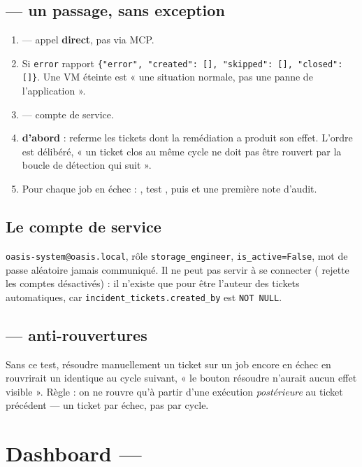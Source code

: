 \subsection*{ --- un passage, sans exception}

\begin{enumerate}
  \item {} --- appel \textbf{direct}, pas via MCP.
  \item Si \texttt{error} \arrowto{} rapport
  \texttt{\{"error", "created": [], "skipped": [], "closed": []\}}. Une VM
  éteinte est « une situation normale, pas une panne de l'application ».
  \item {} --- compte de service.
  \item {} \textbf{d'abord} : referme les tickets dont la
  remédiation a produit son effet. L'ordre est délibéré, « un ticket clos au
  même cycle ne doit pas être rouvert par la boucle de détection qui suit ».
  \item Pour chaque job en échec : , test
  , puis  et une
  première note d'audit.
\end{enumerate}

\subsection*{Le compte de service}
\texttt{oasis-system@oasis.local}, rôle \texttt{storage\_engineer},
\texttt{is\_active=False}, mot de passe aléatoire jamais communiqué. Il ne peut
pas servir à se connecter ( rejette les comptes
désactivés) : il n'existe que pour être l'auteur des tickets automatiques, car
\texttt{incident\_tickets.created\_by} est \texttt{NOT NULL}.

\subsection*{ --- anti-rouvertures}
Sans ce test, résoudre manuellement un ticket sur un job encore en échec en
rouvrirait un identique au cycle suivant, « le bouton résoudre n'aurait aucun
effet visible ». Règle : on ne rouvre qu'à partir d'une exécution
\emph{postérieure} au ticket précédent --- un ticket par échec, pas par cycle.

\section{Dashboard --- }

